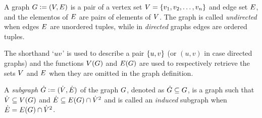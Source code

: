 \documentclass[msc,english,table,xcdraw]{ppgccufmg}
\begin{document}
A graph $G \vcentcolon= (V, E)$ is a pair of a vertex set 
$V = \{v_1, v_2, \ldots, 
v_{n}\}$ and edge set 
$E$, and the elementos of $E$ are pairs of elements of $V$.
The graph is called \textit{undirected} when edges 
$E$ are unordered tuples, while in \textit{directed} graphs
edges are ordered tuples.


The shorthand `$uv$' is used to describe a pair $\{u,
v\}$ (or $(u,v)$ in case directed graphs) and the functions $V(G)$ and $E(G)$ are used to respectively retrieve the sets $V$ and $E$ when they are
omitted in the graph definition.


A \textit{subgraph} $\dot{G} \vcentcolon= (\dot{V}, 
\dot{E})$ of the graph $G$, denoted as $\dot{G} \subseteq 
G$, is a graph such that $\dot{V} \subseteq V(G)$ and
$\dot{E} \subseteq E(G) \cap \dot{V}^{2}$ and is called 
an \textit{induced} subgraph when $\dot{E} = E(G) \cap \dot{V}^{2}$.

\end{document}
